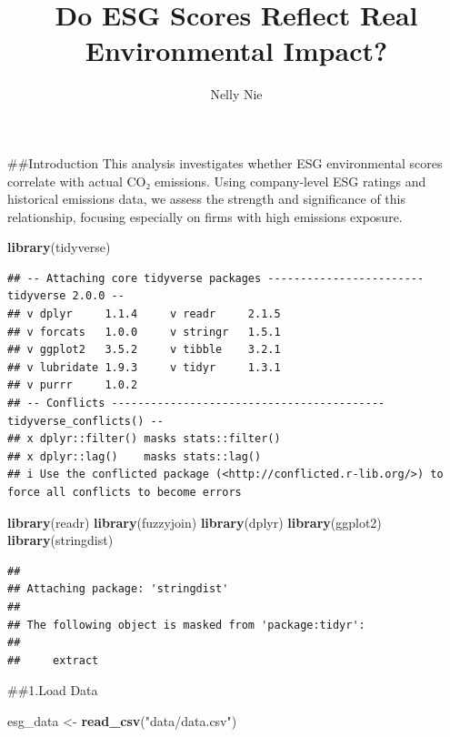 \documentclass[
]{article}
\title{Do ESG Scores Reflect Real Environmental Impact?}
\author{Nelly Nie}
\date{}
\newenvironment{Shaded}{\begin{snugshade}}{\end{snugshade}}
\newcommand{\FunctionTok}[1]{\textcolor[rgb]{0.13,0.29,0.53}{\textbf{#1}}}
\newcommand{\NormalTok}[1]{#1}
\newcommand{\OtherTok}[1]{\textcolor[rgb]{0.56,0.35,0.01}{#1}}
\newcommand{\StringTok}[1]{\textcolor[rgb]{0.31,0.60,0.02}{#1}}
\begin{document}
\maketitle

{
\setcounter{tocdepth}{2}
\tableofcontents
}
\#\#Introduction This analysis investigates whether ESG environmental
scores correlate with actual CO₂ emissions. Using company-level ESG
ratings and historical emissions data, we assess the strength and
significance of this relationship, focusing especially on firms with
high emissions exposure.

\begin{Shaded}
\begin{Highlighting}[]
\FunctionTok{library}\NormalTok{(tidyverse)}
\end{Highlighting}
\end{Shaded}

\begin{verbatim}
## -- Attaching core tidyverse packages ------------------------ tidyverse 2.0.0 --
## v dplyr     1.1.4     v readr     2.1.5
## v forcats   1.0.0     v stringr   1.5.1
## v ggplot2   3.5.2     v tibble    3.2.1
## v lubridate 1.9.3     v tidyr     1.3.1
## v purrr     1.0.2     
## -- Conflicts ------------------------------------------ tidyverse_conflicts() --
## x dplyr::filter() masks stats::filter()
## x dplyr::lag()    masks stats::lag()
## i Use the conflicted package (<http://conflicted.r-lib.org/>) to force all conflicts to become errors
\end{verbatim}

\begin{Shaded}
\begin{Highlighting}[]
\FunctionTok{library}\NormalTok{(readr)}
\FunctionTok{library}\NormalTok{(fuzzyjoin)}
\FunctionTok{library}\NormalTok{(dplyr)}
\FunctionTok{library}\NormalTok{(ggplot2)}
\FunctionTok{library}\NormalTok{(stringdist)}
\end{Highlighting}
\end{Shaded}

\begin{verbatim}
## 
## Attaching package: 'stringdist'
## 
## The following object is masked from 'package:tidyr':
## 
##     extract
\end{verbatim}

\#\#1.Load Data

\begin{Shaded}
\begin{Highlighting}[]
\NormalTok{esg\_data }\OtherTok{\textless{}{-}} \FunctionTok{read\_csv}\NormalTok{(}\StringTok{"data/data.csv"}\NormalTok{)}
\end{Highlighting}
\end{Shaded}
\end{document}
